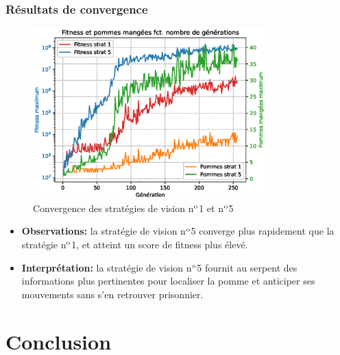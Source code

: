 \documentclass[10pt]{beamer}
\begin{document}
\begin{frame}
\frametitle{Résultats de convergence}
\begin{figure}
\vspace{-0.3cm}
\includegraphics[width=0.8\textwidth]{curve_compare_cv.eps}
\vspace{-0.4cm}
\caption*{\tiny Convergence des stratégies de vision n$\textsuperscript{o}$1 et n$\textsuperscript{o}$5}
\end{figure}
\vspace{-0.4cm}
\begin{itemize}
\footnotesize
\item \textbf{Observations:} la stratégie de vision n$\textsuperscript{o}$5 converge plus rapidement que la stratégie n$\textsuperscript{o}$1, et atteint un score de fitness plus élevé.
\item \textbf{Interprétation:} la stratégie de vision n$\textsuperscript{o}$5 fournit au serpent des informations plus pertinentes pour localiser la pomme et anticiper ses mouvements sans s'en retrouver prisonnier.
\end{itemize}

\end{frame}

\section{Conclusion}
\end{document}
